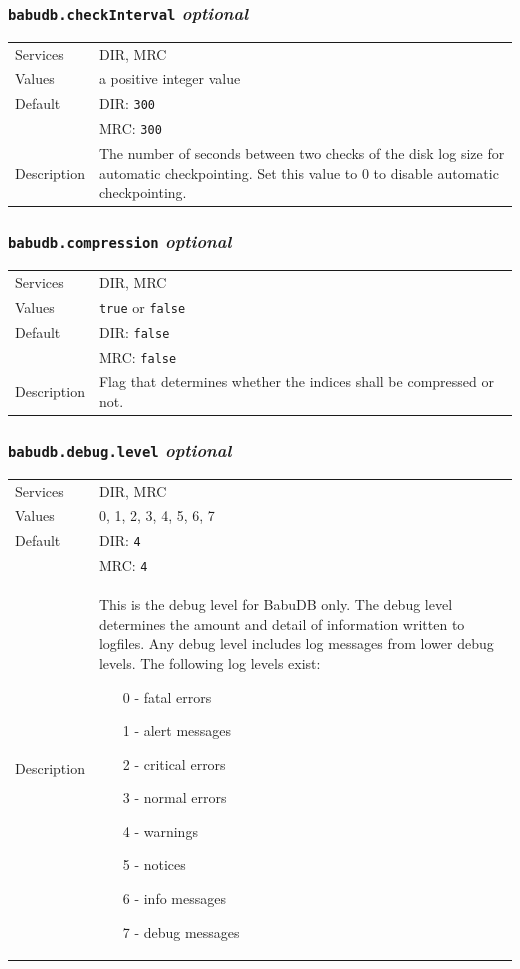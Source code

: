 \documentclass[a4paper,10pt]{book}
\begin{document}
\subsubsection{\texttt{babudb.checkInterval} \textit{optional}}
\begin{tabular}{lp{10cm}}
 Services & DIR, MRC\\
 Values   & a positive integer value\\
 Default  & DIR: \texttt{300}\\
          & MRC: \texttt{300}\\
 Description & The number of seconds between two checks of the disk log size for automatic checkpointing. Set this value to 0 to disable automatic checkpointing. 
\end{tabular}

\subsubsection{\texttt{babudb.compression} \textit{optional}}
\begin{tabular}{lp{10cm}}
 Services & DIR, MRC\\
 Values   & \texttt{true} or \texttt{false}\\
 Default  & DIR: \texttt{false}\\
          & MRC: \texttt{false}\\
 Description & Flag that determines whether the indices shall be compressed or not.
\end{tabular}

\subsubsection{\texttt{babudb.debug.level} \textit{optional}}
\begin{tabular}{lp{10cm}}
 Services & DIR, MRC\\
 Values   & 0, 1, 2, 3, 4, 5, 6, 7 \\
 Default  & DIR: \texttt{4}\\
		  & MRC: \texttt{4}\\
 Description & This is the debug level for BabuDB only. The debug level determines the amount and detail of information written to logfiles. Any debug level includes log messages from lower debug levels. The following log levels exist:
\begin{enumerate}
 \item[0 -] fatal errors
 \item[1 -] alert messages
 \item[2 -] critical errors
 \item[3 -] normal errors
 \item[4 -] warnings
 \item[5 -] notices
 \item[6 -] info messages
 \item[7 -] debug messages
\end{enumerate}
\end{tabular}
\end{document}
